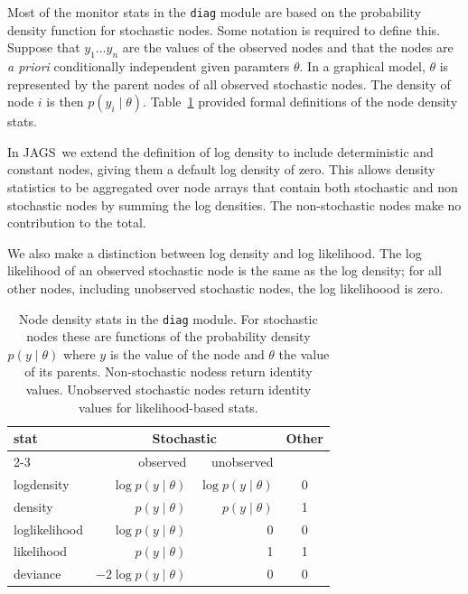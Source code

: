 \documentclass[11pt, a4paper, titlepage]{report}
\newcommand{\JAGS}{\textsf{JAGS}}
\begin{document}
{Most of the monitor stats in the \texttt{diag} module are based on the
probability density function for stochastic nodes. Some notation is
required to define this. Suppose that $y_1 \ldots y_n$ are the values
of the observed nodes and that the nodes are {\em a priori}
conditionally independent given paramters $\theta$. In a graphical
model, $\theta$ is represented by the parent nodes of all observed
stochastic nodes. The density of node $i$ is then $p(y_i \mid
\theta)$. Table~\ref{table:density_stats} provided formal definitions
of the node density stats.

In \JAGS\ we extend the definition of log density to include
deterministic and constant nodes, giving them a default log density of
zero. This allows density statistics to be aggregated over node arrays
that contain both stochastic and non stochastic nodes by summing the
log densities. The non-stochastic nodes make no contribution to the
total.

We also make a distinction between log density and log likelihood. The
log likelihood of an observed stochastic node is the same as the log
density; for all other nodes, including unobserved stochastic nodes,
the log likelihoood is zero.

\begin{table}[h]
\centering
\begin{tabular}{lrrc}
  \hline
  stat          & \multicolumn{2}{c}{Stochastic}          & Other \\
  \cline{2-3}
                & observed                  & unobserved            &    \\
  \hline
  logdensity    &  $\log p(y\mid\theta)$    & $\log p(y\mid\theta)$ &  0 \\
  density       &  $p(y\mid\theta)$         & $p(y\mid\theta)$      &  1 \\
  loglikelihood &  $\log p(y\mid\theta)$    & 0                     &  0 \\
  likelihood    &  $p(y\mid\theta)$         & 1                     &  1 \\
  deviance      &  $-2 \log p(y\mid\theta)$ & 0                     &  0 \\
  \hline
\end{tabular}
\caption{\label{table:density_stats} Node density stats in the
  \texttt{diag} module. For stochastic nodes these are functions of
  the probability density $p(y\mid\theta)$ where $y$ is the value of
  the node and $\theta$ the value of its parents. Non-stochastic
  nodess return identity values. Unobserved stochastic nodes
  return identity values for likelihood-based stats.}
\end{table}

}
\end{document}
